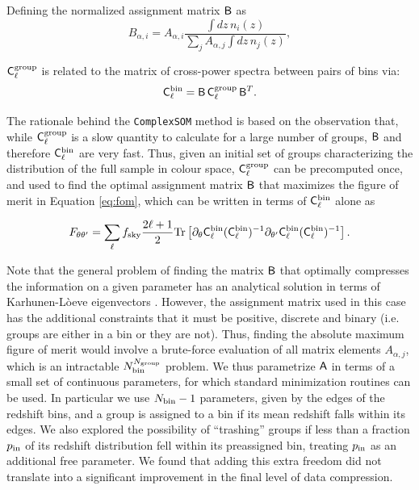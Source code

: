 \documentclass[twocolumn,twocolappendix]{aastex63}
\begin{document}
Defining the normalized assignment matrix ${\sf B}$ as
\begin{equation}
B_{\alpha,i}=A_{\alpha,i}\frac{\int dz\,n_i(z)}{\sum_j A_{\alpha,j}\int dz\,n_j(z)},
\end{equation}

${\sf C}^{\rm group}_\ell$ is related to the matrix of cross-power spectra
between pairs of bins via:
\begin{equation}
{\sf C}^{\rm bin}_\ell={\sf B}\,{\sf C}^{\rm group}_\ell\,{\sf B}^T.
\end{equation}

The rationale behind the {\tt ComplexSOM} method is based on the observation
that, while ${\sf C}^{\rm group}_\ell$ is a slow quantity to calculate for a
large number of groups, ${\sf B}$ and therefore ${\sf C}^{\rm bin}_\ell$ are
very fast. Thus, given an initial set of groups characterizing the
distribution of the full sample in colour space, ${\sf C}^{\rm group}_\ell$
can be precomputed once, and used to find the optimal assignment matrix ${\sf
B}$ that maximizes the figure of merit in Equation \ref{eq:fom},
which can be written in terms of ${\sf C}^{\rm bin}_\ell$ alone as

\begin{equation}\label{eq:fom_tr}
F_{\theta\theta'}=\sum_\ell f_{\rm sky}\frac{2\ell+1}{2}{\rm Tr}\left[\partial_\theta{\sf C}^{\rm bin}_\ell({\sf C}^{\rm bin}_\ell)^{-1}\partial_{\theta'}{\sf C}^{\rm bin}_\ell({\sf C}_\ell^{\rm bin})^{-1}\right].
\end{equation}

Note that the general problem of finding the matrix ${\sf B}$ that optimally
compresses the information on a given parameter has an analytical solution in
terms of Karhunen-L\`oeve eigenvectors \citep{astro-ph/9603021}. However, the
assignment matrix used in this case has the additional constraints that it
must be positive, discrete and binary (i.e. groups are either in a bin or they
are not). Thus, finding the absolute maximum figure of merit would involve a
brute-force evaluation of all matrix elements $A_{\alpha,j}$, which is an
intractable $N_{\rm bin}^{N_{\rm group}}$ problem. We thus parametrize ${\sf
A}$ in terms of a small set of continuous parameters, for which standard
minimization routines can be used. In particular we use $N_{\rm bin}-1$
parameters, given by the edges of the redshift bins, and a group is assigned
to a bin if its mean redshift falls within its edges. We also explored the
possibility of ``trashing'' groups if less than a fraction $p_{\rm in}$ of its
redshift distribution fell within its preassigned bin, treating $p_{\rm in}$
as an additional free parameter. We found that adding this extra freedom did
not translate into a significant improvement in the final level of data
compression.
\end{document}
